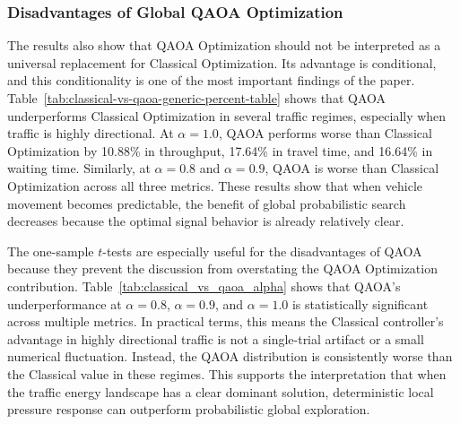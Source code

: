 \documentclass[12pt]{article}
\begin{document}
\subsubsection{Disadvantages of Global QAOA Optimization}

The results also show that QAOA Optimization should not be interpreted as a universal replacement for Classical Optimization. Its advantage is conditional, and this conditionality is one of the most important findings of the paper. Table~\ref{tab:classical-vs-qaoa-generic-percent-table} shows that QAOA underperforms Classical Optimization in several traffic regimes, especially when traffic is highly directional. At $\alpha=1.0$, QAOA performs worse than Classical Optimization by 10.88\% in throughput, 17.64\% in travel time, and 16.64\% in waiting time. Similarly, at $\alpha=0.8$ and $\alpha=0.9$, QAOA is worse than Classical Optimization across all three metrics. These results show that when vehicle movement becomes predictable, the benefit of global probabilistic search decreases because the optimal signal behavior is already relatively clear.

The one-sample $t$-tests are especially useful for the disadvantages of QAOA because they prevent the discussion from overstating the QAOA Optimization contribution. Table~\ref{tab:classical_vs_qaoa_alpha} shows that QAOA's underperformance at $\alpha=0.8$, $\alpha=0.9$, and $\alpha=1.0$ is statistically significant across multiple metrics. In practical terms, this means the Classical controller's advantage in highly directional traffic is not a single-trial artifact or a small numerical fluctuation. Instead, the QAOA distribution is consistently worse than the Classical value in these regimes. This supports the interpretation that when the traffic energy landscape has a clear dominant solution, deterministic local pressure response can outperform probabilistic global exploration.
\end{document}
